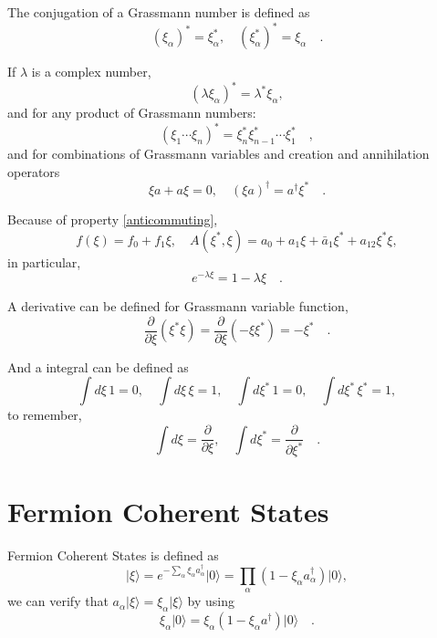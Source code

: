 \documentclass{book}
\newcommand{\ket}[1]{{|#1\rangle}}
\numberwithin{equation}{section}
\begin{document}
The conjugation of a Grassmann number is defined as
\begin{equation}
  (\xi_\alpha)^*=\xi_\alpha^*,\quad(\xi_\alpha^*)^*=\xi_\alpha\quad.
\end{equation}

If $\lambda$ is a complex number,
\begin{equation}
  (\lambda\xi_\alpha)^*=\lambda^*\xi_\alpha,
  \label{anticommuting}
\end{equation}
and for any product of Grassmann numbers:
\begin{equation}
  (\xi_1\cdots\xi_n)^*=\xi_n^*\xi_{n-1}^*\cdots\xi_1^*\quad,
\end{equation}
and for combinations of Grassmann variables and creation and
annihilation operators
\begin{equation}
  \xi a+a\xi=0,\quad(\xi a)^\dag=a^\dag\xi^*\quad.
\end{equation}

Because of property \eqref{anticommuting}, 
\begin{equation}
  f(\xi)=f_0+f_1\xi,\quad 
  A(\xi^*,\xi)=a_0+a_1\xi+\bar{a}_1\xi^*+a_{12}\xi^*\xi,
\end{equation}
in particular,
\begin{equation}
  e^{-\lambda\xi}=1-\lambda\xi\quad.
\end{equation}

A derivative can be defined for Grassmann variable function,
\begin{equation}
  \frac{\partial}{\partial\xi}(\xi^*\xi)=
  \frac{\partial}{\partial\xi}(-\xi\xi^*)=-\xi^*\quad.
\end{equation}

And a integral can be defined as
\begin{equation}
  \int d\xi\,1=0,\quad\int d\xi\,\xi=1,
  \quad\int d\xi^*\,1=0,\quad\int d\xi^*\,\xi^*=1,
\end{equation}
to remember,
\begin{equation}
  \int d\xi=\frac{\partial}{\partial\xi},\quad
  \int d\xi^*=\frac{\partial}{\partial\xi^*}\quad.
\end{equation}


\section{Fermion Coherent States}
Fermion Coherent States is defined as
\begin{equation}
  \ket{\xi}=e^{-\sum_\alpha\xi_\alpha a_\alpha^\dag}\ket{0}
  =\prod_\alpha(1-\xi_\alpha a_\alpha^\dag)\ket{0},
\end{equation}
we can verify that $a_\alpha\ket{\xi}=\xi_\alpha\ket{\xi}$ by using
\begin{equation}
  \xi_\alpha\ket{0}=\xi_\alpha(1-\xi_\alpha a^\dag)\ket{0}\quad.
\end{equation}
\end{document}
